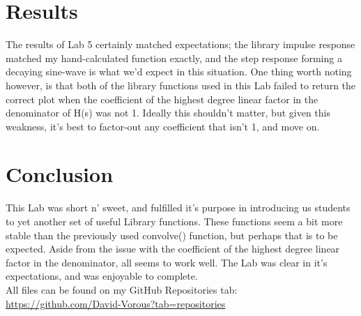 \documentclass[12pt]{report}
\begin{document}
\section{Results}

The results of Lab 5 certainly matched expectations; the library impulse response matched my hand-calculated function exactly, and the step response forming a decaying sine-wave is what we'd expect in this situation. One thing worth noting however, is that both of the library functions used in this Lab failed to return the correct plot when the coefficient of the highest degree linear factor in the denominator of H(s) was not 1. Ideally this shouldn't matter, but given this weakness, it's best to factor-out any coefficient that isn't 1, and move on.

\section{Conclusion}

This Lab was short n' sweet, and fulfilled it's purpose in introducing us students to yet another set of useful Library functions. These functions seem a bit more stable than the previously used convolve() function, but perhaps that is to be expected. Aside from the issue with the coefficient of the highest degree linear factor  in the denominator, all seems to work well. The Lab was clear in it's expectations, and was enjoyable to complete.\\

All files can be found on my GitHub Repositories tab:\\
\url{https://github.com/David-Vorous?tab=repositories}
\end{document}
